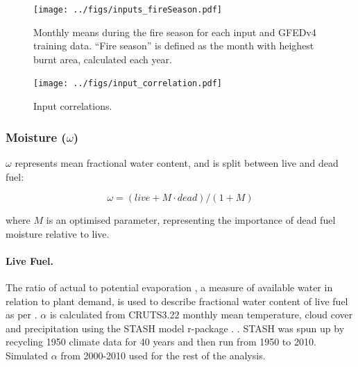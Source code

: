 \begin{figure}[!ht]
  \centering
    \texttt{[image: ../figs/inputs\_fireSeason.pdf]}
  \caption{Monthly means during the fire season for each input  and GFEDv4 training data. ``Fire season'' is defined as the month with heighest burnt area, calculated each year.}
  \label{fig:Season_mean_ins}
\end{figure}

\begin{figure}[!ht]
  \centering
    \texttt{[image: ../figs/input\_correlation.pdf]}
  \caption{Input correlations.}
  \label{fig:Corr_ins}
\end{figure}

\subsubsection{Moisture ($\omega$)}

$\omega$ represents mean fractional water content, and is split between live and dead fuel:

\begin{equation}
    \omega = (live + M \cdot dead) / (1 + M)
\end{equation}

where $M$ is an optimised parameter, representing the importance of dead fuel moisture relative to live.

\paragraph{Live Fuel.}
The ratio of actual to potential evaporation \citep[$\alpha$][]{prentice1993simulation}, a measure of available water in relation to plant demand, is used to describe fractional water content of live fuel as per \citet{harrison2010fire, bistinas2014causal}.
$\alpha$ is calculated from CRUTS3.22 monthly mean temperature, cloud cover and precipitation using the STASH model \citep{sykes1996bioclimatic} r-package \citep{rstash}. . STASH was spun up by recycling 1950 climate data for 40 years and then run from 1950 to 2010. Simulated $\alpha$ from 2000-2010 used for the rest of the analysis.

